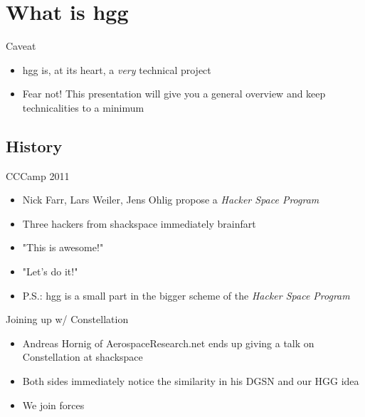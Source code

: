 
\newlength{\smallcol}
\setlength{\smallcol}{0.333333333333\textwidth}

\newlength{\bigcol}
\setlength{\bigcol}{\textwidth}
\addtolength{\bigcol}{- \smallcol}


\begin{frame}[plain]
\end{frame}

\section{What is hgg}
	\begin{frame}{Caveat}
	\begin{itemize}
		\item hgg is, at its heart, a \emph{very} technical project
		\item Fear not!  This presentation will give you a general overview and keep technicalities to a minimum
	\end{itemize}
	\end{frame}

\subsection{History}
	\begin{frame}{CCCamp 2011}
		\begin{itemize}
			\item Nick Farr, Lars Weiler, Jens Ohlig propose a \emph{Hacker Space Program}
			\item Three hackers from shackspace immediately brainfart
			\item "This is awesome!"
			\item "Let's do it!"
			\item P.S.: hgg is a small part in the bigger scheme of the \emph{Hacker Space Program}
		\end{itemize}
	\end{frame}

	\begin{frame}{Joining up w/ Constellation}
		\begin{itemize}
			\item Andreas Hornig of AerospaceResearch.net ends up giving a talk on Constellation at shackspace
			\item Both sides immediately notice the similarity in his DGSN and our HGG idea
			\item We join forces
		\end{itemize}
	\end{frame}

